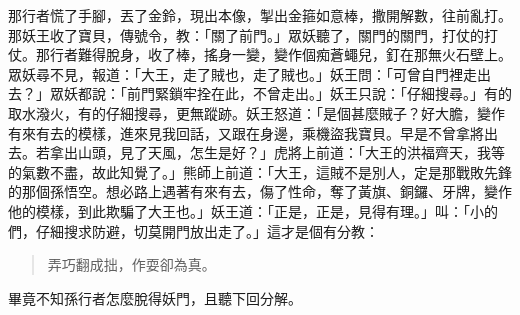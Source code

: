 那行者慌了手腳，丟了金鈴，現出本像，掣出金箍如意棒，撒開解數，往前亂打。那妖王收了寶貝，傳號令，教：「關了前門。」眾妖聽了，關門的關門，打仗的打仗。那行者難得脫身，收了棒，搖身一變，變作個痴蒼蠅兒，釘在那無火石壁上。眾妖尋不見，報道：「大王，走了賊也，走了賊也。」妖王問：「可曾自門裡走出去？」眾妖都說：「前門緊鎖牢拴在此，不曾走出。」妖王只說：「仔細搜尋。」有的取水潑火，有的仔細搜尋，更無蹤跡。妖王怒道：「是個甚麼賊子？好大膽，變作有來有去的模樣，進來見我回話，又跟在身邊，乘機盜我寶貝。早是不曾拿將出去。若拿出山頭，見了天風，怎生是好？」虎將上前道：「大王的洪福齊天，我等的氣數不盡，故此知覺了。」熊師上前道：「大王，這賊不是別人，定是那戰敗先鋒的那個孫悟空。想必路上遇著有來有去，傷了性命，奪了黃旗、銅鑼、牙牌，變作他的模樣，到此欺騙了大王也。」妖王道：「正是，正是，見得有理。」叫：「小的們，仔細搜求防避，切莫開門放出走了。」這才是個有分教：
\begin{quote}
弄巧翻成拙，作耍卻為真。
\end{quote}

畢竟不知孫行者怎麼脫得妖門，且聽下回分解。
